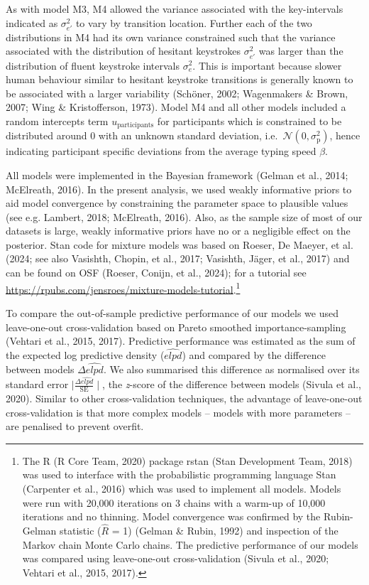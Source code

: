 \documentclass[
  man,floatsintext]{apa7}
\begin{document}
As with model M3, M4 allowed the variance associated with the key-intervals indicated as \(\sigma_{e'}^2\) to vary by transition location. Further each of the two distributions in M4 had its own variance constrained such that the variance associated with the distribution of hesitant keystrokes \(\sigma_{e'}^2\) was larger than the distribution of fluent keystroke intervals \(\sigma_{e}^2\). This is important because slower human behaviour similar to hesitant keystroke transitions is generally known to be associated with a larger variability (Schöner, 2002; Wagenmakers \& Brown, 2007; Wing \& Kristofferson, 1973). Model M4 and all other models included a random intercepts term \(u_\text{participants}\) for participants which is constrained to be distributed around 0 with an unknown standard deviation, i.e.~\(\mathcal{N}(0, \sigma_\text{p}^2)\), hence indicating participant specific deviations from the average typing speed \(\beta\).

All models were implemented in the Bayesian framework (Gelman et al., 2014; McElreath, 2016). In the present analysis, we used weakly informative priors to aid model convergence by constraining the parameter space to plausible values (see e.g. Lambert, 2018; McElreath, 2016). Also, as the sample size of most of our datasets is large, weakly informative priors have no or a negligible effect on the posterior. Stan code for mixture models was based on Roeser, De Maeyer, et al. (2024; see also Vasishth, Chopin, et al., 2017; Vasishth, Jäger, et al., 2017) and can be found on OSF (Roeser, Conijn, et al., 2024); for a tutorial see \href{rpubs.com/jensroes/mixture-models-tutorial}{https://rpubs.com/jensroes/mixture-models-tutorial}.\footnote{The R (R Core Team, 2020) package rstan (Stan Development Team, 2018) was used to interface with the probabilistic programming language Stan (Carpenter et al., 2016) which was used to implement all models. Models were run with 20,000 iterations on 3 chains with a warm-up of 10,000 iterations and no thinning. Model convergence was confirmed by the Rubin-Gelman statistic (\(\hat{R}\) = 1) (Gelman \& Rubin, 1992) and inspection of the Markov chain Monte Carlo chains. The predictive performance of our models was compared using leave-one-out cross-validation (Sivula et al., 2020; Vehtari et al., 2015, 2017).}

To compare the out-of-sample predictive performance of our models we used leave-one-out cross-validation based on Pareto smoothed importance-sampling (Vehtari et al., 2015, 2017). Predictive performance was estimated as the sum of the expected log predictive density (\(\widehat{elpd}\)) and compared by the difference between models \(\Delta\widehat{elpd}\). We also summarised this difference as normalised over its standard error \(\mid\frac{\Delta\widehat{elpd}}{\text{SE}}\mid\), the \emph{z}-score of the difference between models (Sivula et al., 2020). Similar to other cross-validation techniques, the advantage of leave-one-out cross-validation is that more complex models -- models with more parameters -- are penalised to prevent overfit.
\end{document}
